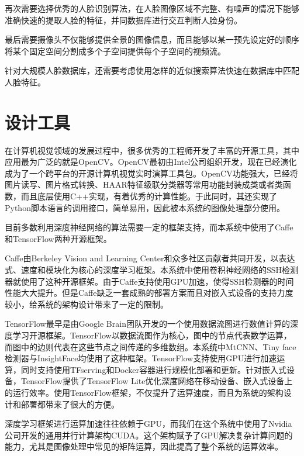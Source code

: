 再次需要选择优秀的人脸识别算法，在人脸图像区域不完整、有噪声的情况下能够准确快速的提取人脸的特征，并同数据库进行交互判断人脸身份。

最后需要摄像头不仅能够提供全景的图像信息，而且能够以某一预先设定好的顺序将某个固定空间分割成多个子空间提供每个子空间的视频流。

针对大规模人脸数据库，还需要考虑使用怎样的近似搜索算法快速在数据库中匹配人脸特征。

\section{设计工具}

在计算机视觉领域的发展过程中，很多优秀的工程师开发了丰富的开源工具，其中应用最为广泛的就是OpenCV\cite{opencv_library}。OpenCV最初由Intel公司组织开发，现在已经演化成为了一个跨平台的开源计算机视觉实时演算工具包。OpenCV功能强大，已经将图片读写、图片格式转换、HAAR特征级联分类器等常用功能封装成类或者类函数，而且底层使用C++实现，有着优秀的计算性能。于此同时，其还实现了Python脚本语言的调用接口，简单易用，因此被本系统的图像处理部分使用。

目前多数利用深度神经网络的算法需要一定的框架支持，而本系统中使用了Caffe\cite{jia2014caffe}和TensorFlow\cite{tensorflow2015-whitepaper}两种开源框架。

Caffe由Berkeley Vision and Learning Center和众多社区贡献者共同开发，以表达式、速度和模块化为核心的深度学习框架。本系统中使用卷积神经网络的SSH检测器就使用了这种开源框架。由于Caffe支持使用GPU加速，使得SSH检测器的时间性能大大提升。但是Caffe缺乏一套成熟的部署方案而且对嵌入式设备的支持力度较小，给系统的架构设计带来了一定的限制。

TensorFlow最早是由Google Brain团队开发的一个使用数据流图进行数值计算的深度学习开源框架。TensorFlow以数据流图作为核心，图中的节点代表数学运算，而图中的边则代表在这些节点之间传递的多维数组。本系统中MtCNN\cite{zhang2016joint}、Tiny face检测器\cite{hu2017finding}与InsightFace\cite{deng2018arcface}均使用了这种框架。TensorFlow支持使用GPU进行加速运算，同时支持使用TFserving和Docker容器进行规模化部署和更新。针对嵌入式设备，TensorFlow提供了TensorFlow Lite优化深度网络在移动设备、嵌入式设备上的运行效率。使用TensorFlow框架，不仅提升了运算速度，而且为系统的架构设计和部署都带来了很大的方便。

深度学习框架进行运算加速往往依赖于GPU，而我们在这个系统中使用了Nvidia公司开发的通用并行计算架构CUDA\cite{nickolls2008scalable}。这个架构赋予了GPU解决复杂计算问题的能力，尤其是图像处理中常见的矩阵运算，因此提高了整个系统的运算效率。

